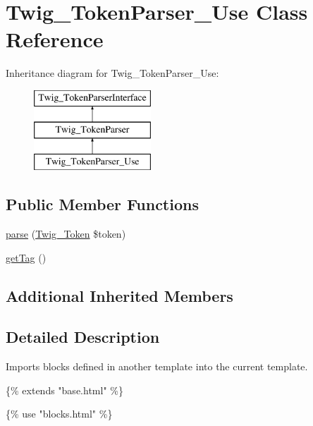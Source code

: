\hypertarget{class_twig___token_parser___use}{}\section{Twig\+\_\+\+Token\+Parser\+\_\+\+Use Class Reference}
\label{class_twig___token_parser___use}
Inheritance diagram for Twig\+\_\+\+Token\+Parser\+\_\+\+Use\+:\begin{figure}[H]
\begin{center}
\leavevmode
\includegraphics[height=3.000000cm]{class_twig___token_parser___use}
\end{center}
\end{figure}
\subsection*{Public Member Functions}
\begin{DoxyCompactItemize}
\item 
\hyperlink{class_twig___token_parser___use_a5dfa2e269321584fb74e8b43dabe0efd}{parse} (\hyperlink{class_twig___token}{Twig\+\_\+\+Token} \$token)
\item 
\hyperlink{class_twig___token_parser___use_ab86ba36154b20e6bbfa3ba705f12f9d6}{get\+Tag} ()
\end{DoxyCompactItemize}
\subsection*{Additional Inherited Members}


\subsection{Detailed Description}
Imports blocks defined in another template into the current template.


\begin{DoxyPre}
\{\% extends "base.html" \%\}\end{DoxyPre}



\begin{DoxyPre}\{\% use "blocks.html" \%\}\end{DoxyPre}



